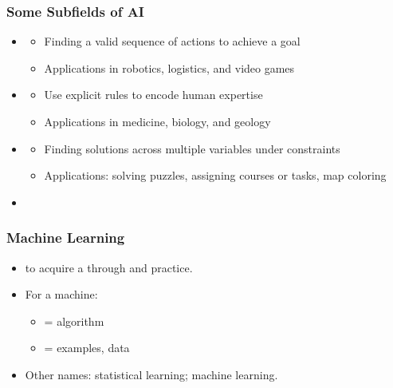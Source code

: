 \begin{frame}
  \frametitle{Some Subfields of AI}
  \begin{itemize}
  \item {}
    \begin{itemize}
    \item Finding a valid sequence of actions to achieve a goal
    \item Applications in robotics, logistics, and video games
    \end{itemize}
  \item {}
    \begin{itemize}
    \item Use explicit rules to encode human expertise
    \item Applications in medicine, biology, and geology
    \end{itemize}
  \item {}
    \begin{itemize}
    \item Finding solutions across multiple variables under constraints
    \item Applications: solving puzzles, assigning courses or tasks, map coloring
    \end{itemize}
  \item {}
  \end{itemize}
  \pause {}
\end{frame}

\begin{frame}
  \frametitle{Machine Learning}
  \begin{itemize}
  \item {}
    \pause
    to acquire a  through  and practice.
  \item For a machine:
    \begin{itemize}
    \item {} = algorithm
    \item {} = examples, data
    \end{itemize}
    \pause
  \item Other names: statistical learning; machine learning.
  \end{itemize}
\end{frame}

